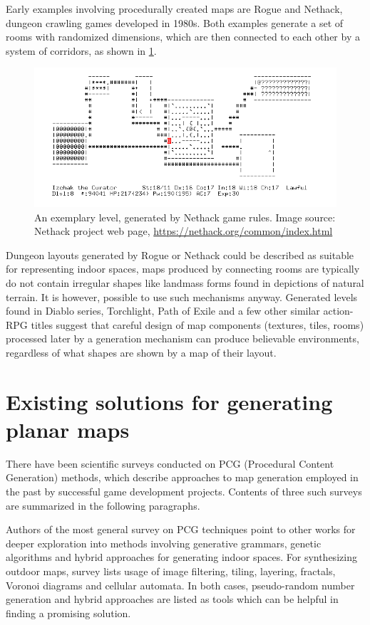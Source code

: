 \documentclass[12pt]{report}
\begin{document}
Early examples involving procedurally created maps are Rogue and Nethack, dungeon crawling games developed in 1980s. Both examples generate a set of rooms with randomized dimensions, which are then connected to each other by a system of corridors, as shown in \cref{fig:nethack}.
 

\begin{figure}[H]
	\centering
	\includegraphics[width=0.7\linewidth]{images/nethack}
	\caption{An exemplary level, generated by Nethack game rules. Image source: Nethack project web page, \url{https://nethack.org/common/index.html}}
	\label{fig:nethack}
\end{figure}

Dungeon layouts generated by Rogue or Nethack could be described as suitable for representing indoor spaces, maps produced by connecting rooms are typically do not contain irregular shapes like landmass forms found in depictions of natural terrain. It is however, possible to use such mechanisms anyway. Generated levels found in Diablo series, Torchlight, Path of Exile and a few other similar action-RPG titles suggest that careful design of map components (textures, tiles, rooms) processed later by a generation mechanism can produce believable environments, regardless of what shapes are shown by a map of their layout. 
	

\section{Existing solutions for generating planar maps}

There have been scientific surveys conducted on PCG (Procedural Content Generation) methods, which describe approaches to map generation employed in the past by successful game development projects. Contents of three such surveys are summarized in the following paragraphs.

Authors of the most general survey on PCG techniques \autocite{hendrikx2013procedural} point to other works for deeper exploration into methods involving generative grammars, genetic algorithms and hybrid approaches for generating indoor spaces. For synthesizing outdoor maps, survey lists usage of image filtering, tiling, layering, fractals, Voronoi diagrams and cellular automata. In both cases, pseudo-random number generation and hybrid approaches are listed as tools which can be helpful in finding a promising solution. 
\end{document}
